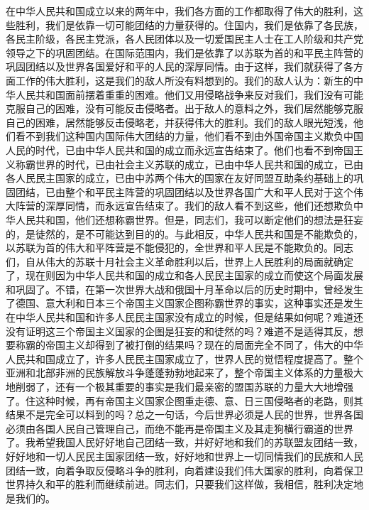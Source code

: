 在中华人民共和国成立以来的两年中，我们各方面的工作都取得了伟大的胜利，这些胜利，我们是依靠一切可能团结的力量获得的。住国内，我们是依靠了各民族，各民主阶级，各民主党派，各人民团体以及一切爱国民主人士在工人阶级和共产党领导之下的巩固团结。在国际范围内，我们是依靠了以苏联为首的和平民主阵营的巩固团结以及世界各国爱好和平的人民的深厚同情。由于这样，我们就获得了各方面工作的伟大胜利，这是我们的敌人所没有料想到的。我们的敌人认为：新生的中华人民共和国面前摆着重重的困难。他们又用侵略战争来反对我们，我们没有可能克服自己的困难，没有可能反击侵略者。出于敌人的意料之外，我们居然能够克服自己的困难，居然能够反击侵略老，并获得伟大的胜利。我们的敌人眼光短浅，他们看不到我们这种国内国际伟大团结的力量，他们看不到由外国帝国主义欺负中国人民的时代，已由中华人民共和国的成立而永远宣告结束了。他们也看不到帝国王义称霸世界的时代，已由社会主义苏联的成立，已由中华人民共和国的成立，已由各人民民主国家的成立，已由中苏两个伟大的国家在友好同盟互助条约基础上的巩固团结，已由整个和平民主阵营的巩固团结以及世界各国广大和平人民对于这个伟大阵营的深厚同情，而永远宣告结束了。我们的敌人看不到这些，他们还想欺负中华人民共和国，他们还想称霸世界。但是，同志们，我可以断定他们的想法是狂妄的，是徒然的，是不可能达到目的的。与此相反，中华人民共和国是不能欺负的，以苏联为首的伟大和平阵营是不能侵犯的，全世界和平人民是不能欺负的。同志们，自从伟大的苏联十月社会主义革命胜利以后，世界上人民胜利的局面就确定了，现在则因为中华人民共和国的成立和各人民民主国家的成立而使这个局面发展和巩固了。不错，在第一次世界大战和俄国十月革命以后的历史时期中，曾经发生了德国、意大利和日本三个帝国主义国家企图称霸世界的事实，这种事实还是发生在中华人民共和国和许多人民民主国家没有成立的时候，但是结果如何呢？难道还没有证明这三个帝国主义国家的企图是狂妄的和徒然的吗？难道不是适得其反，想要称霸的帝国主义却得到了被打倒的结果吗？现在的局面完全不同了，伟大的中华人民共和国成立了，许多人民民主国家成立了，世界人民的觉悟程度提高了。整个亚洲和北部非洲的民族解放斗争蓬蓬勃勃地起来了，整个帝国主义体系的力量极大地削弱了，还有一个极其重要的事实是我们最亲密的盟国苏联的力量大大地增强了。住这种时候，再有帝国主义国家企图重走德、意、日三国侵略者的老路，则其结果不是完全可以料到的吗？总之一句话，今后世界必须是人民的世界，世界各国必须由各国人民自己管理自己，而绝不能再是帝国主义及其走狗横行霸道的世界了。我希望我国人民好好地自己团结一致，并好好地和我们的苏联盟友团结一致，好好地和一切人民民主国家团结一致，好好地和世界上一切同情我们的民族和人民团结一致，向着争取反侵略斗争的胜利，向着建设我们伟大国家的胜利，向着保卫世界持久和平的胜利而继续前进。同志们，只要我们这样做，我相信，胜利决定地是我们的。


